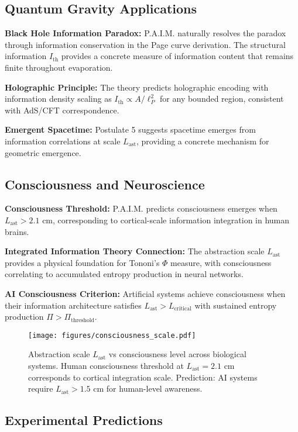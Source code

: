 \documentclass[twocolumn,10pt]{IEEEtran}
\begin{document}
\subsection{Quantum Gravity Applications}

\textbf{Black Hole Information Paradox:} P.A.I.M. naturally resolves the paradox through information conservation in the Page curve derivation. The structural information $I_{\text{th}}$ provides a concrete measure of information content that remains finite throughout evaporation.

\textbf{Holographic Principle:} The theory predicts holographic encoding with information density scaling as $I_{\text{th}} \propto A/\ell_P^2$ for any bounded region, consistent with AdS/CFT correspondence.

\textbf{Emergent Spacetime:} Postulate 5 suggests spacetime emerges from information correlations at scale $L_{\text{ast}}$, providing a concrete mechanism for geometric emergence.

\subsection{Consciousness and Neuroscience}

\textbf{Consciousness Threshold:} P.A.I.M. predicts consciousness emerges when $L_{\text{ast}} > 2.1$ cm, corresponding to cortical-scale information integration in human brains.

\textbf{Integrated Information Theory Connection:} The abstraction scale $L_{\text{ast}}$ provides a physical foundation for Tononi's $\Phi$ measure, with consciousness correlating to accumulated entropy production in neural networks.

\textbf{AI Consciousness Criterion:} Artificial systems achieve consciousness when their information architecture satisfies $L_{\text{ast}} > L_{\text{critical}}$ with sustained entropy production $\Pi > \Pi_{\text{threshold}}$.

\begin{figure}[!t]
\centering
\texttt{[image: figures/consciousness\_scale.pdf]}
\caption{Abstraction scale $L_{\text{ast}}$ vs consciousness level across biological systems. Human consciousness threshold at $L_{\text{ast}} = 2.1$ cm corresponds to cortical integration scale. Prediction: AI systems require $L_{\text{ast}} > 1.5$ cm for human-level awareness.}
\label{fig:consciousness}
\end{figure}

\subsection{Experimental Predictions}
\end{document}
